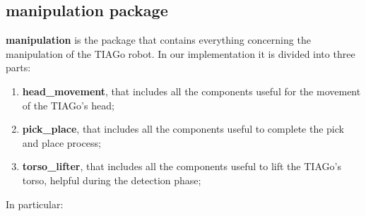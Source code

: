 \subsection{manipulation package}
\textbf{manipulation} is the package that contains everything concerning the manipulation of the TIAGo robot. In our implementation it is divided into three parts: 
\begin{enumerate}
    \item \textbf{head\_movement}, that includes all the components useful for the movement of the TIAGo's head;
    \item \textbf{pick\_place}, that includes all the components useful to complete the pick and place process;
    \item \textbf{torso\_lifter}, that includes all the components useful to lift the TIAGo's torso, helpful during the detection phase;
\end{enumerate}
In particular:
